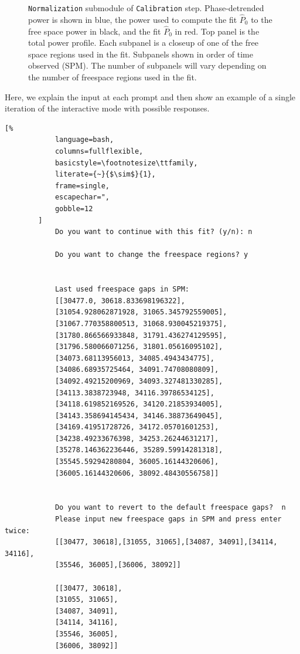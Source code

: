 \documentclass[titlepage, 12pt]{article}
\begin{document}
\begin{appendix}
\begin{figure}[H]
{                 \texttt{Normalization} submodule of \texttt{Calibration}
                 step. Phase-detrended power is shown in blue, the power used
                 to compute the fit $\hat{P}_0$ to the free space power in
                 black, and the fit $\hat{P}_0$ in red. Top panel is the total
                 power profile. Each subpanel is a closeup of one of the free
                 space regions used in the fit. Subpanels shown in order of
                 time observed (SPM). The number of subpanels will vary
                 depending on the number of freespace regions used in the fit.}
            \label{fig:fspfit_examp}
        \end{figure}
        Here, we explain the input at each prompt and then show an example
        of a single iteration of the interactive mode with possible responses.
        \begin{lstlisting}[%
            language=bash,
            columns=fullflexible,
            basicstyle=\footnotesize\ttfamily,
            literate={~}{$\sim$}{1},
            frame=single,
            escapechar=",
            gobble=12
        ]
            Do you want to continue with this fit? (y/n): n

            Do you want to change the freespace regions? y


            Last used freespace gaps in SPM: 
            [[30477.0, 30618.833698196322],
            [31054.928062871928, 31065.345792559005],
            [31067.770358800513, 31068.930045219375],
            [31780.866566933848, 31791.436274129595],
            [31796.580066071256, 31801.05616095102],
            [34073.68113956013, 34085.4943434775],
            [34086.68935725464, 34091.74708080809],
            [34092.49215200969, 34093.327481330285],
            [34113.3838723948, 34116.39786534125],
            [34118.619852169526, 34120.21853934005],
            [34143.358694145434, 34146.38873649045],
            [34169.41951728726, 34172.05701601253],
            [34238.49233676398, 34253.26244631217],
            [35278.146362236446, 35289.59914281318],
            [35545.59294280804, 36005.16144320606],
            [36005.16144320606, 38092.48430556758]]


            Do you want to revert to the default freespace gaps?  n
            Please input new freespace gaps in SPM and press enter twice: 
            [[30477, 30618],[31055, 31065],[34087, 34091],[34114, 34116],
            [35546, 36005],[36006, 38092]]

            [[30477, 30618],
            [31055, 31065],
            [34087, 34091],
            [34114, 34116],
            [35546, 36005],
            [36006, 38092]]


\end{lstlisting}
\end{appendix}
\end{document}

